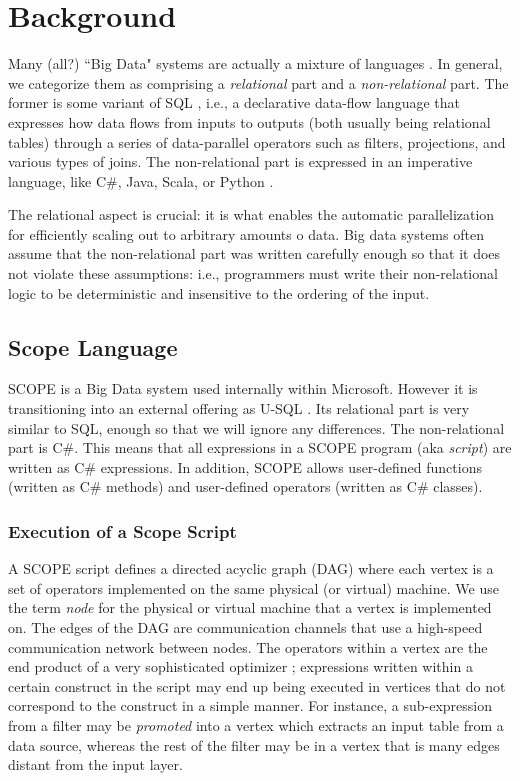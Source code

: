 \section{Background}
\label{sec:background}
Many (all?) ``Big Data" systems are actually a mixture of languages \cite{}.
In general, we categorize them as comprising a {\it relational} part and a {\it non-relational} part.
The former is some variant of SQL \cite{}, i.e., a declarative data-flow language that expresses how data flows
from inputs to outputs (both usually being relational tables) through a series of data-parallel operators
such as filters, projections, and various types of joins.
The non-relational part is expressed in an imperative language, like C\#, Java, Scala, or Python \cite{}.

The relational aspect is crucial: it is what enables the automatic parallelization for efficiently scaling out to
arbitrary amounts o data.
Big data systems often assume that the non-relational part was written carefully enough so that it does not
violate these assumptions: i.e., programmers must write their non-relational logic to be deterministic and insensitive
to the ordering of the input.

\subsection{Scope Language}
SCOPE \cite{} is a Big Data system used internally within Microsoft.
However it is transitioning into an external offering as U-SQL \cite{}.
Its relational part is very similar to SQL, enough so that we will ignore any differences.
The non-relational part is C\#\cite{}.
This means that all expressions in a SCOPE program (aka {\it script}) are written as C\# expressions.
In addition, SCOPE allows user-defined functions (written as C\# methods) and user-defined operators
(written as C\# classes).

\subsubsection{Execution of a Scope Script}
A SCOPE script defines a directed acyclic graph (DAG) where each vertex is a set of operators implemented on the
same physical (or virtual) machine. We use the term {\it node} for the physical or virtual machine that a
vertex is implemented on.
The edges of the DAG are communication channels that use a high-speed communication network between nodes.
The operators within a vertex are the end product of a very sophisticated optimizer \cite{}; expressions written
within a certain construct in the script may end up being executed in vertices that do not correspond to the
construct in a simple manner.
For instance, a sub-expression from a filter may be {\it promoted} into a vertex which extracts an input
table from a data source, whereas the rest of the filter may be in a vertex that is many edges distant from
the input layer.


